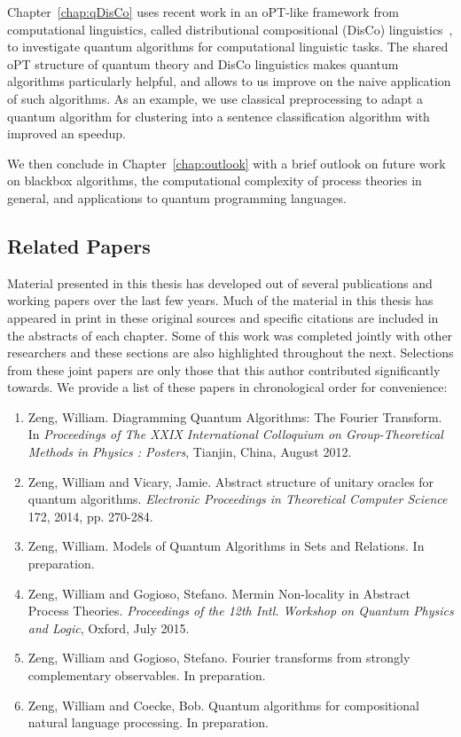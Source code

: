 Chapter~\ref{chap:qDisCo} uses recent work in an oPT-like framework from computational linguistics, called distributional compositional (DisCo) linguistics~\cite{clark2008compositional}, to investigate quantum algorithms for computational linguistic tasks. The shared oPT structure of quantum theory and DisCo linguistics makes quantum algorithms particularly helpful, and allows to us improve on the naive application of such algorithms. As an example, we use classical preprocessing to adapt a quantum algorithm for clustering into a sentence classification algorithm with improved an speedup.

We then conclude in Chapter~\ref{chap:outlook} with a brief outlook on future work on blackbox algorithms, the computational complexity of process theories in general, and applications to quantum programming languages.
 
\subsection*{Related Papers}

Material presented in this thesis has developed out of several publications and working papers over the last few years. Much of the material in this thesis has appeared in print in these original sources and specific citations are included in the abstracts of each chapter. Some of this work was completed jointly with other researchers and these sections are also highlighted throughout the next.  Selections from these joint papers are only those that this author contributed significantly towards. We provide a list of these papers in chronological order for convenience:

\begin{enumerate}
\item Zeng, William. Diagramming Quantum Algorithms: The Fourier Transform. In \emph{Proceedings of The XXIX International Colloquium on Group-Theoretical Methods in Physics
: Posters}, Tianjin, China, August 2012.
\item Zeng, William and Vicary, Jamie. Abstract structure of unitary oracles for quantum algorithms. \emph{Electronic Proceedings in Theoretical Computer Science} 172, 2014, pp. 270-284.
\item Zeng, William. Models of Quantum Algorithms in Sets and Relations. In preparation.
\item Zeng, William and Gogioso, Stefano. Mermin Non-locality in Abstract Process Theories. \emph{Proceedings of the 12th Intl. Workshop on Quantum Physics and Logic}, Oxford, July 2015.
\item Zeng, William and Gogioso, Stefano. Fourier transforms from strongly complementary observables. In preparation.
\item Zeng, William and Coecke, Bob. Quantum algorithms for compositional natural language processing. In preparation.
\end{enumerate}

